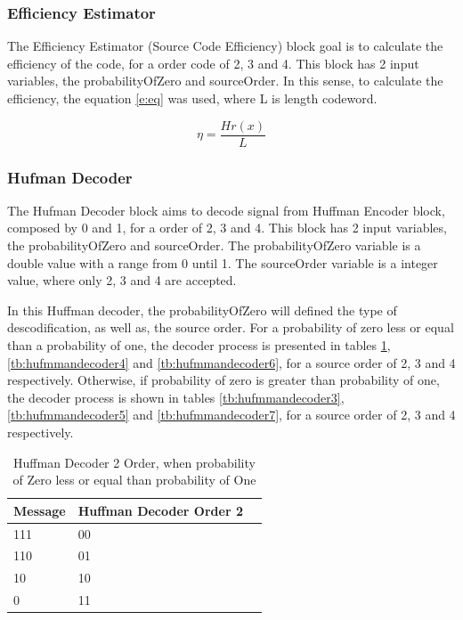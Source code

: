\begin{refsection}
\subsubsection{Efficiency Estimator}
The Efficiency Estimator (Source Code Efficiency) block goal is to calculate the efficiency of the code, for a order code of 2, 3 and 4. This block has 2 input variables, the probabilityOfZero and sourceOrder.
In this sense, to calculate the efficiency, the equation \ref{e:eq} was used, where L is length codeword.

\begin{equation}
\eta=\frac{Hr(x)}{L}
 \label{e:eq}
\end{equation}

\subsubsection{Hufman Decoder}


The Hufman Decoder block aims to decode signal from Huffman Encoder block, composed by 0 and 1, for a order of 2, 3 and 4. This block has 2 input variables, the probabilityOfZero and sourceOrder. 
The probabilityOfZero variable is a double value with a range from 0 until 1. The sourceOrder variable is a integer value, where only 2, 3 and 4 are accepted.

In this Huffman decoder, the probabilityOfZero will defined the type of descodification, as well as, the source order. For a probability of zero less or equal than a probability of one, the decoder process is presented in tables \ref{tb:hufmmandecoder2}, \ref{tb:hufmmandecoder4} and \ref{tb:hufmmandecoder6}, for a source order of 2, 3 and 4 respectively.
Otherwise, if probability of zero is greater than probability of one, the decoder process is shown in tables \ref{tb:hufmmandecoder3}, \ref{tb:hufmmandecoder5} and \ref{tb:hufmmandecoder7}, for a source order of 2, 3 and 4 respectively.


\begin{table}[H]
\centering
\caption{Huffman Decoder 2 Order, when probability of Zero less or equal than probability of One}
\label{tb:hufmmandecoder2}
\begin{tabular}{|l|l|l|}
\hline
\textbf{Message}                      & \textbf{Huffman Decoder Order 2}                                       \\ \hline
111              & 00                                               \\ \hline
110              & 01                                           \\ \hline
10                & 10                                      \\ \hline
0                  & 11                                  \\ \hline


\end{tabular}
\end{table}
\end{refsection}

